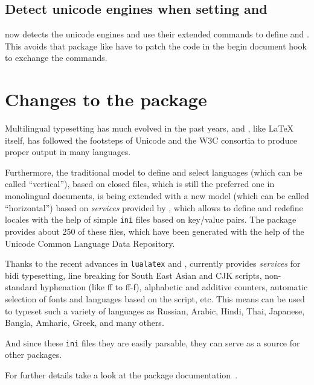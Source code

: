 \documentclass{ltnews}
\begin{document}
\subsection{Detect unicode engines when setting  and }

 now detects the unicode engines and use their extended
commands to define  and . This avoids that package like 
 have to patch the code in the begin document hook to exchange the commands.


\section{Changes to the  package}

Multilingual typesetting has much evolved in the past years, and
, like \LaTeX{} itself, has followed the footsteps of
Unicode and the W3C consortia to produce proper output in many
languages.

Furthermore, the traditional model to define and select languages
(which can be called \enquote{vertical}), based on closed files, which
is still the preferred one in monolingual documents, is being extended
with a new model (which can be called \enquote{horizontal}) based on
\emph{services} provided by , which allows to define and
redefine locales with the help of simple \texttt{ini} files based on
key/value pairs.  The  package provides about 250 of these files, which
have been generated with the help of the Unicode Common Language Data
Repository.

Thanks to the recent advances in \texttt{lualatex} and
,  currently provides \emph{services} for bidi
typesetting, line breaking for South East Asian and CJK scripts,
non-standard hyphenation (like ff to ff-f), alphabetic and additive
counters, automatic selection of fonts and languages based on the
script, etc. This means  can be used to typeset such a variety of
languages as Russian, Arabic, Hindi, Thai, Japanese, Bangla, Amharic,
Greek, and many others.

And since these \texttt{ini} files they are easily parsable, they can
serve as a source for other packages.

For further details take a look at the  package
documentation~\cite{32:babel}.
\end{document}
